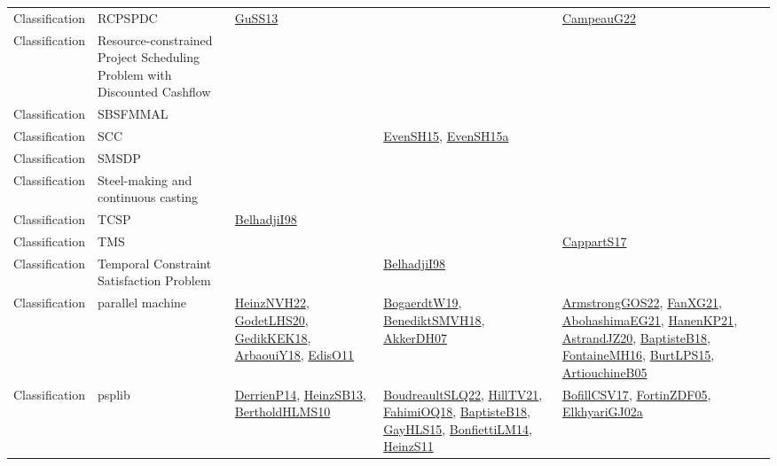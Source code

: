 {\begin{longtable}{lp{3cm}>{\raggedright}p{6cm}>{\raggedright}p{6cm}p{8cm}}
Classification & RCPSPDC & \href{papers/GuSS13.pdf}{GuSS13}\cite{GuSS13} &  & \href{articles/CampeauG22.pdf}{CampeauG22}\cite{CampeauG22}\\
Classification & Resource-constrained Project Scheduling Problem with Discounted Cashflow &  &  & \\
Classification & SBSFMMAL &  &  & \\
Classification & SCC &  & \href{papers/EvenSH15.pdf}{EvenSH15}\cite{EvenSH15}, \href{articles/EvenSH15a.pdf}{EvenSH15a}\cite{EvenSH15a} & \\
Classification & SMSDP &  &  & \\
Classification & Steel-making and continuous casting &  &  & \\
Classification & TCSP & \href{articles/BelhadjiI98.pdf}{BelhadjiI98}\cite{BelhadjiI98} &  & \\
Classification & TMS &  &  & \href{papers/CappartS17.pdf}{CappartS17}\cite{CappartS17}\\
Classification & Temporal Constraint Satisfaction Problem &  & \href{articles/BelhadjiI98.pdf}{BelhadjiI98}\cite{BelhadjiI98} & \\
Classification & parallel machine & \href{articles/HeinzNVH22.pdf}{HeinzNVH22}\cite{HeinzNVH22}, \href{papers/GodetLHS20.pdf}{GodetLHS20}\cite{GodetLHS20}, \href{articles/GedikKEK18.pdf}{GedikKEK18}\cite{GedikKEK18}, \href{papers/ArbaouiY18.pdf}{ArbaouiY18}\cite{ArbaouiY18}, \href{papers/EdisO11.pdf}{EdisO11}\cite{EdisO11} & \href{papers/BogaerdtW19.pdf}{BogaerdtW19}\cite{BogaerdtW19}, \href{papers/BenediktSMVH18.pdf}{BenediktSMVH18}\cite{BenediktSMVH18}, \href{papers/AkkerDH07.pdf}{AkkerDH07}\cite{AkkerDH07} & \href{papers/ArmstrongGOS22.pdf}{ArmstrongGOS22}\cite{ArmstrongGOS22}, \href{articles/FanXG21.pdf}{FanXG21}\cite{FanXG21}, \href{articles/AbohashimaEG21.pdf}{AbohashimaEG21}\cite{AbohashimaEG21}, \href{papers/HanenKP21.pdf}{HanenKP21}\cite{HanenKP21}, \href{articles/AstrandJZ20.pdf}{AstrandJZ20}\cite{AstrandJZ20}, \href{articles/BaptisteB18.pdf}{BaptisteB18}\cite{BaptisteB18}, \href{papers/FontaineMH16.pdf}{FontaineMH16}\cite{FontaineMH16}, \href{papers/BurtLPS15.pdf}{BurtLPS15}\cite{BurtLPS15}, \href{papers/ArtiouchineB05.pdf}{ArtiouchineB05}\cite{ArtiouchineB05}\\
Classification & psplib & \href{papers/DerrienP14.pdf}{DerrienP14}\cite{DerrienP14}, \href{articles/HeinzSB13.pdf}{HeinzSB13}\cite{HeinzSB13}, \href{papers/BertholdHLMS10.pdf}{BertholdHLMS10}\cite{BertholdHLMS10} & \href{papers/BoudreaultSLQ22.pdf}{BoudreaultSLQ22}\cite{BoudreaultSLQ22}, \href{papers/HillTV21.pdf}{HillTV21}\cite{HillTV21}, \href{articles/FahimiOQ18.pdf}{FahimiOQ18}\cite{FahimiOQ18}, \href{articles/BaptisteB18.pdf}{BaptisteB18}\cite{BaptisteB18}, \href{papers/GayHLS15.pdf}{GayHLS15}\cite{GayHLS15}, \href{papers/BonfiettiLM14.pdf}{BonfiettiLM14}\cite{BonfiettiLM14}, \href{papers/HeinzS11.pdf}{HeinzS11}\cite{HeinzS11} & \href{papers/BofillCSV17.pdf}{BofillCSV17}\cite{BofillCSV17}, \href{papers/FortinZDF05.pdf}{FortinZDF05}\cite{FortinZDF05}, \href{papers/ElkhyariGJ02a.pdf}{ElkhyariGJ02a}\cite{ElkhyariGJ02a}\\

\end{longtable}}
